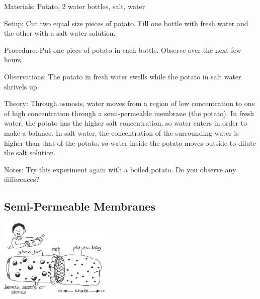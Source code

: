 \begin{multicols}{2}
\begin{description*}
\item[Materials:]{Potato, 2 water bottles, salt, water}
\item[Setup:]{Cut two equal size pieces of potato. Fill one bottle with fresh water and the other with a salt water solution.}
\item[Procedure:]{Put one piece of potato in each bottle. Observe over the next few hours.}
\item[Observations:]{The potato in fresh water swells while the potato in salt water shrivels up.}
\item[Theory:]{Through osmosis, water moves from a region of low concentration to one of high concentration through a semi-permeable membrane (the potato). In fresh water, the potato has the higher salt concentration, so water enters in order to make a balance. In salt water, the concentration of the surrounding water is higher than that of the potato, so water inside the potato moves outside to dilute the salt solution.}
\item[Notes:]{Try this experiment again with a boiled potato. Do you observe any differences?}
\end{description*}

\columnbreak

\subsection{Semi-Permeable Membranes}

\begin{center}
\includegraphics[width=0.4\textwidth]{./img/vso/membrane.jpg}
\end{center}


\end{multicols}
